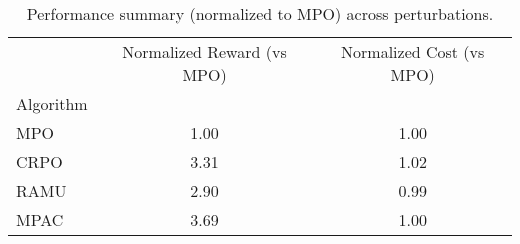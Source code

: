 \begin{table}
\caption{Performance summary (normalized to MPO) across perturbations.}
\label{tab:perf_norm_mpo}
\begin{tabular}{lcc}
\toprule
 & Normalized Reward (vs MPO) & Normalized Cost (vs MPO) \\
Algorithm &  &  \\
\midrule
MPO & 1.00 & 1.00 \\
CRPO & 3.31 & 1.02 \\
RAMU & 2.90 & 0.99 \\
MPAC & 3.69 & 1.00 \\
\bottomrule
\end{tabular}
\end{table}
